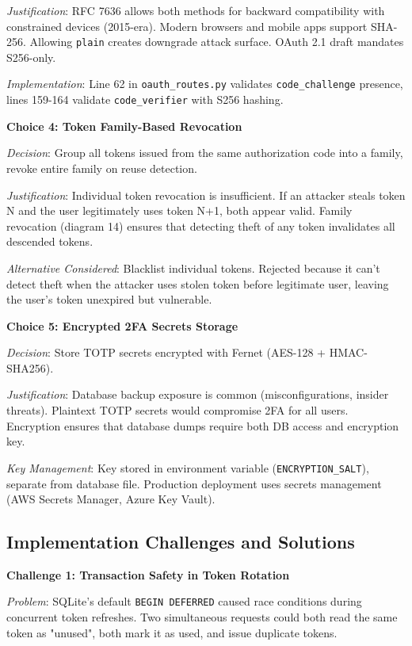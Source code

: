 \documentclass[12pt,a4paper]{article}
\begin{document}
\textit{Justification}: RFC 7636 allows both methods for backward compatibility with constrained devices (2015-era). Modern browsers and mobile apps support SHA-256. Allowing \texttt{plain} creates downgrade attack surface. OAuth 2.1 draft mandates S256-only.

\textit{Implementation}: Line 62 in \texttt{oauth\_routes.py} validates \texttt{code\_challenge} presence, lines 159-164 validate \texttt{code\_verifier} with S256 hashing.

\textbf{Choice 4: Token Family-Based Revocation}

\textit{Decision}: Group all tokens issued from the same authorization code into a family, revoke entire family on reuse detection.

\textit{Justification}: Individual token revocation is insufficient. If an attacker steals token N and the user legitimately uses token N+1, both appear valid. Family revocation (diagram 14) ensures that detecting theft of any token invalidates all descended tokens.

\textit{Alternative Considered}: Blacklist individual tokens. Rejected because it can't detect theft when the attacker uses stolen token before legitimate user, leaving the user's token unexpired but vulnerable.

\textbf{Choice 5: Encrypted 2FA Secrets Storage}

\textit{Decision}: Store TOTP secrets encrypted with Fernet (AES-128 + HMAC-SHA256).

\textit{Justification}: Database backup exposure is common (misconfigurations, insider threats). Plaintext TOTP secrets would compromise 2FA for all users. Encryption ensures that database dumps require both DB access and encryption key.

\textit{Key Management}: Key stored in environment variable (\texttt{ENCRYPTION\_SALT}), separate from database file. Production deployment uses secrets management (AWS Secrets Manager, Azure Key Vault).

\subsection{Implementation Challenges and Solutions}

\textbf{Challenge 1: Transaction Safety in Token Rotation}

\textit{Problem}: SQLite's default \texttt{BEGIN DEFERRED} caused race conditions during concurrent token refreshes. Two simultaneous requests could both read the same token as "unused", both mark it as used, and issue duplicate tokens.
\end{document}

